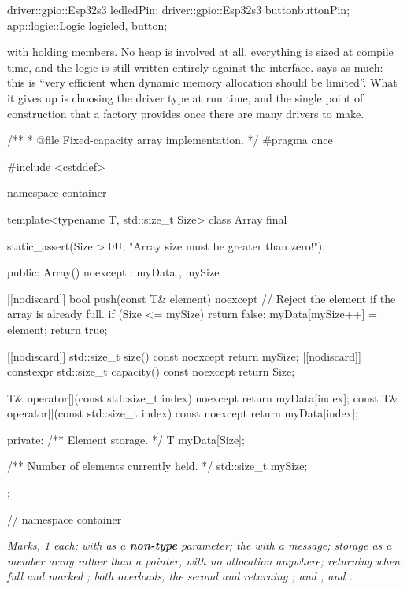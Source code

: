 \begin{cppcode}
driver::gpio::Esp32s3 led{ledPin};
driver::gpio::Esp32s3 button{buttonPin};
app::logic::Logic logic{led, button};
\end{cppcode}

\noindent with  holding  members. No heap is involved at
all, everything is sized at compile time, and the logic is still written entirely against the
interface.  says as much: this is ``very efficient when dynamic memory allocation
should be limited''. What it gives up is choosing the driver type at run time, and the single point
of construction that a factory provides once there are many drivers to make. 


\begin{cppcode}
/**
 * @file Fixed-capacity array implementation.
 */
#pragma once

#include <cstddef>

namespace container
{
template<typename T, std::size_t Size>
class Array final
{
    static_assert(Size > 0U, "Array size must be greater than zero!");

public:
    Array() noexcept
        : myData{}
        , mySize{}
    {}

    [[nodiscard]] bool push(const T& element) noexcept
    {
        // Reject the element if the array is already full.
        if (Size <= mySize) { return false; }
        myData[mySize++] = element;
        return true;
    }

    [[nodiscard]] std::size_t size() const noexcept { return mySize; }
    [[nodiscard]] constexpr std::size_t capacity() const noexcept { return Size; }

    T& operator[](const std::size_t index) noexcept { return myData[index]; }
    const T& operator[](const std::size_t index) const noexcept { return myData[index]; }

private:
    /** Element storage. */
    T myData[Size];

    /** Number of elements currently held. */
    std::size_t mySize;
};
} // namespace container
\end{cppcode}

{\itshape Marks, 1 each:  with  as a
\textbf{non-type} parameter; the  with a message; storage as a member array
rather than a pointer, with no allocation anywhere;  returning  when full and
marked \code{[[nodiscard]]}; both  overloads, the second  and
returning ;  and ,  and
\code{[[nodiscard]]}.\par}


